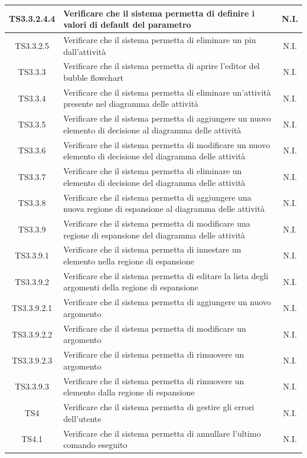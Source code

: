 \documentclass[../PianoDiQualifica.tex]{subfiles}
\begin{document}
\begin{longtable}{|c|>{\centering}p{10cm}|c|}
	\hline
	TS3.3.2.4.4 & Verificare che il sistema permetta di definire i valori di default del parametro & N.I. \\
	\hline
	TS3.3.2.5 & Verificare che il sistema permetta di eliminare un pin dall'attività & N.I. \\
	\hline
	TS3.3.3 & Verificare che il sistema permetta di aprire l'editor del bubble flowchart & N.I. \\
	\hline
	TS3.3.4 & Verificare che il sistema permetta di eliminare un'attività presente nel diagramma delle attività & N.I. \\
	\hline
	TS3.3.5 & Verificare che il sistema permetta di aggiungere un nuovo elemento di decisione al diagramma delle attività & N.I. \\
	\hline
	TS3.3.6 & Verificare che il sistema permetta di modificare un nuovo elemento di decisione del diagramma delle attività & N.I. \\
	\hline
	TS3.3.7 & Verificare che il sistema permetta di eliminare un elemento di decisione del diagramma delle attività & N.I. \\
	\hline
	TS3.3.8 & Verificare che il sistema permetta di aggiungere una nuova regione di espansione al diagramma delle attività & N.I. \\
	\hline
	TS3.3.9 & Verificare che il sistema permetta di modificare una regione di espansione del diagramma delle attività & N.I. \\
	\hline
	TS3.3.9.1 & Verificare che il sistema permetta di innestare un elemento nella regione di espansione & N.I. \\
	\hline
	TS3.3.9.2 & Verificare che il sistema permetta di editare la lista degli argomenti della regione di espansione & N.I. \\
	\hline
	TS3.3.9.2.1 & Verificare che il sistema permetta di aggiungere un nuovo argomento & N.I. \\
	\hline
	TS3.3.9.2.2 & Verificare che il sistema permetta di modificare un argomento & N.I. \\
	\hline
	TS3.3.9.2.3 & Verificare che il sistema permetta di rimuovere un argomento & N.I. \\
	\hline
	TS3.3.9.3 & Verificare che il sistema permetta di rimuovere un elemento dalla regione di espansione & N.I. \\
	\hline
	TS4 & Verificare che il sistema permetta di gestire gli errori dell'utente & N.I. \\
	\hline
	TS4.1 & Verificare che il sistema permetta di annullare l'ultimo comando eseguito & N.I. \\

\end{longtable}
\end{document}
